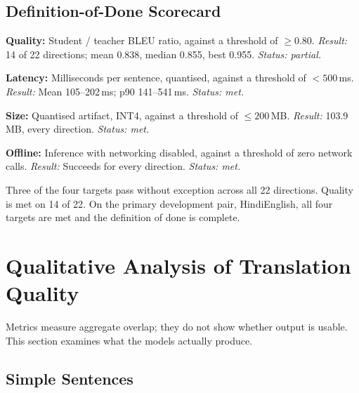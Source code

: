 \subsection{Definition-of-Done Scorecard}
\label{subsec:dod}

\begin{bullets}
\item \textbf{Quality:} Student / teacher BLEU ratio, against a threshold of $\geq 0.80$. \emph{Result:} 14 of 22 directions; mean 0.838, median 0.855, best 0.955. \emph{Status: partial.}
\item \textbf{Latency:} Milliseconds per sentence, quantised, against a threshold of $<500$\,ms. \emph{Result:} Mean 105--202\,ms; p90 141--541\,ms. \emph{Status: met.}
\item \textbf{Size:} Quantised artifact, INT4, against a threshold of $\leq 200$\,MB. \emph{Result:} 103.9\,MB, every direction. \emph{Status: met.}
\item \textbf{Offline:} Inference with networking disabled, against a threshold of zero network calls. \emph{Result:} Succeeds for every direction. \emph{Status: met.}
\end{bullets}

Three of the four targets pass without exception across all 22 directions.
Quality is met on 14 of 22. On the primary development pair,
Hindi\arrowto{}English, all four targets are met and the definition of done is
complete.

\section{Qualitative Analysis of Translation Quality}
\label{sec:qualitative}

Metrics measure aggregate overlap; they do not show whether output is usable.
This section examines what the models actually produce.

\subsection{Simple Sentences}
\label{subsec:simplesentences}

